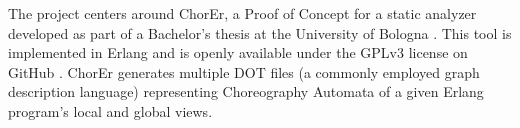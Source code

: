 The project centers around ChorEr, a Proof of Concept for a static analyzer 
developed as part of a Bachelor's thesis at the University of Bologna 
\cite{genovese2023chorer}. This tool is implemented in Erlang and is openly 
available under the GPLv3 license on GitHub \cite{website:chorer}. ChorEr 
generates multiple DOT files (a commonly employed graph description language) 
representing Choreography Automata of a given Erlang program's local and 
global views.
